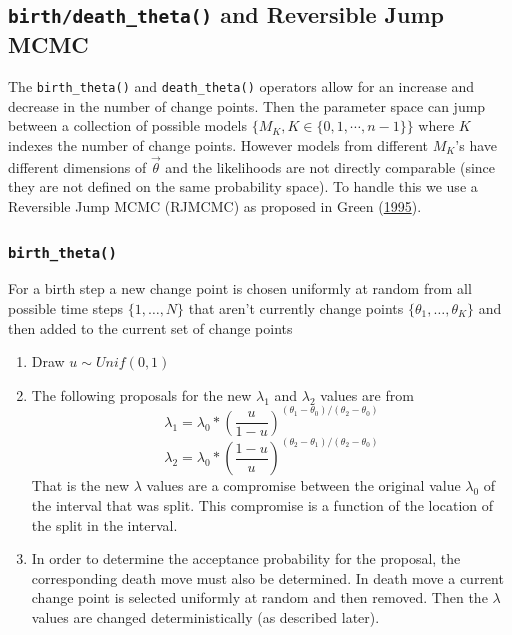 \documentclass[11pt,a4paper]{article}
\begin{document}
\hypertarget{birthdeath_theta-and-reversible-jump-mcmc}{%
\subsection{\texorpdfstring{\texttt{birth/death\_theta()} and Reversible
Jump
MCMC}{birth/death\_theta() and Reversible Jump MCMC}}\label{birthdeath_theta-and-reversible-jump-mcmc}}

The \texttt{birth\_theta()} and \texttt{death\_theta()} operators allow
for an increase and decrease in the number of change points. Then the
parameter space can jump between a collection of possible models
\(\{M_K, K \in \{0,1,\cdots,n-1\}\}\) where \(K\) indexes the number of
change points. However models from different \(M_K\)'s have different
dimensions of \(\vec{\theta}\) and the likelihoods are not directly
comparable (since they are not defined on the same probability space).
To handle this we use a Reversible Jump MCMC (RJMCMC) as proposed in
Green (\protect\hyperlink{ref-green_reversible_1995}{1995}).

\hypertarget{birth_theta}{%
\subsubsection{\texorpdfstring{\texttt{birth\_theta()}}{birth\_theta()}}\label{birth_theta}}

For a birth step a new change point is chosen uniformly at random from
all possible time steps \(\{1,\dots,N\}\) that aren't currently change
points \(\{\theta_1,\dots,\theta_K\}\) and then added to the current set
of change points

\begin{enumerate}
\def\labelenumi{\arabic{enumi}.}
\item
  Draw \(u \sim Unif(0,1)\)
\item
  The following proposals for the new \(\lambda_1\) and \(\lambda_2\)
  values are from
  \[\lambda_1 = \lambda_0*(\frac{u}{1-u})^{(\theta_1-\theta_0)/(\theta_2-\theta_0)}\]
  \[\lambda_2 = \lambda_0*(\frac{1-u}{u})^{(\theta_2-\theta_1)/(\theta_2-\theta_0)}\]
  That is the new \(\lambda\) values are a compromise between the
  original value \(\lambda_0\) of the interval that was split. This
  compromise is a function of the location of the split in the interval.
\item
  In order to determine the acceptance probability for the proposal, the
  corresponding death move must also be determined. In death move a
  current change point is selected uniformly at random and then removed.
  Then the \(\lambda\) values are changed deterministically (as
  described later).
\end{enumerate}
\end{document}
